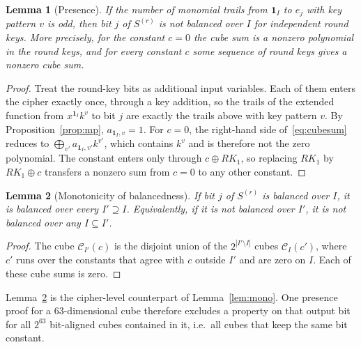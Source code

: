 \documentclass[11pt,a4paper]{article}
\newtheorem{lemma}{Lemma}
\theoremstyle{definition}
\theoremstyle{remark}
\begin{document}
\begin{lemma}[Presence]\label{lem:presence}
If the number of monomial trails from $\mathbf 1_I$ to $e_j$ with key pattern $v$ is odd, then bit $j$ of $S^{(r)}$ is not balanced over $I$ for independent round keys. More precisely, for the constant $c=0$ the cube sum is a nonzero polynomial in the round keys, and for every constant $c$ some sequence of round keys gives a nonzero cube sum.
\end{lemma}
\begin{proof}
Treat the round-key bits as additional input variables. Each of them enters the cipher exactly once, through a key addition, so the trails of the extended function from $x^{\mathbf 1_I}k^v$ to bit $j$ are exactly the trails above with key pattern $v$. By Proposition~\ref{prop:mp}, $a_{\mathbf 1_I,v}=1$. For $c=0$, the right-hand side of~\eqref{eq:cubesum} reduces to $\bigoplus_{v'}a_{\mathbf 1_I,v'}k^{v'}$, which contains $k^v$ and is therefore not the zero polynomial. The constant enters only through $c\oplus RK_1$, so replacing $RK_1$ by $RK_1\oplus c$ transfers a nonzero sum from $c=0$ to any other constant.
\end{proof}

\begin{lemma}[Monotonicity of balancedness]\label{lem:monobal}
If bit $j$ of $S^{(r)}$ is balanced over $I$, it is balanced over every $I'\supseteq I$. Equivalently, if it is not balanced over $I'$, it is not balanced over any $I\subseteq I'$.
\end{lemma}
\begin{proof}
The cube $\mathcal C_{I'}(c)$ is the disjoint union of the $2^{|I'\setminus I|}$ cubes $\mathcal C_I(c')$, where $c'$ runs over the constants that agree with $c$ outside $I'$ and are zero on $I$. Each of these cube sums is zero.
\end{proof}
Lemma~\ref{lem:monobal} is the cipher-level counterpart of Lemma~\ref{lem:mono}. One presence proof for a 63-dimensional cube therefore excludes a property on that output bit for all $2^{63}$ bit-aligned cubes contained in it, i.e.\ all cubes that keep the same bit constant.
\end{document}
